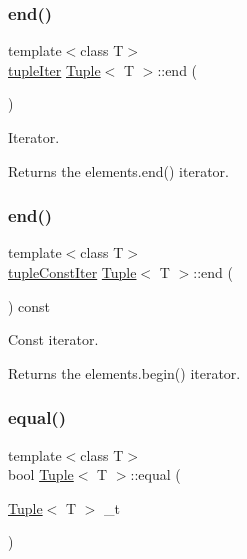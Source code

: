 \subsubsection{\texorpdfstring{end()}{end()}\hspace{0.1cm}{\footnotesize\ttfamily [1/2]}}
{\footnotesize\ttfamily template$<$class T$>$ \\
\mbox{\hyperlink{maths_8hh_ad22dcdeefda7d41523cc1604953eb6cc}{tuple\+Iter}} \mbox{\hyperlink{class_tuple}{Tuple}}$<$ T $>$\+::end (\begin{DoxyParamCaption}{ }\end{DoxyParamCaption})\hspace{0.3cm}{\ttfamily [inline]}}



Iterator. 

\begin{DoxyReturn}{Returns}
the elements.\+end() iterator. 
\end{DoxyReturn}
\mbox{\label{class_tuple_ac55a72437773f17dd8fbccf866d7e7eb}} 
\subsubsection{\texorpdfstring{end()}{end()}\hspace{0.1cm}{\footnotesize\ttfamily [2/2]}}
{\footnotesize\ttfamily template$<$class T$>$ \\
\mbox{\hyperlink{maths_8hh_a2eba794860251c1b30e532df32ee4d1b}{tuple\+Const\+Iter}} \mbox{\hyperlink{class_tuple}{Tuple}}$<$ T $>$\+::end (\begin{DoxyParamCaption}{ }\end{DoxyParamCaption}) const\hspace{0.3cm}{\ttfamily [inline]}}



Const iterator. 

\begin{DoxyReturn}{Returns}
the elements.\+begin() iterator. 
\end{DoxyReturn}
\mbox{\label{class_tuple_a68d1d3aaecc187f8f78b46f4e1b48260}} 
\subsubsection{\texorpdfstring{equal()}{equal()}}
{\footnotesize\ttfamily template$<$class T$>$ \\
bool \mbox{\hyperlink{class_tuple}{Tuple}}$<$ T $>$\+::equal (\begin{DoxyParamCaption}\item[{\mbox{\hyperlink{class_tuple}{Tuple}}$<$ T $>$}]{\+\_\+t }\end{DoxyParamCaption})\hspace{0.3cm}{\ttfamily [inline]}}

